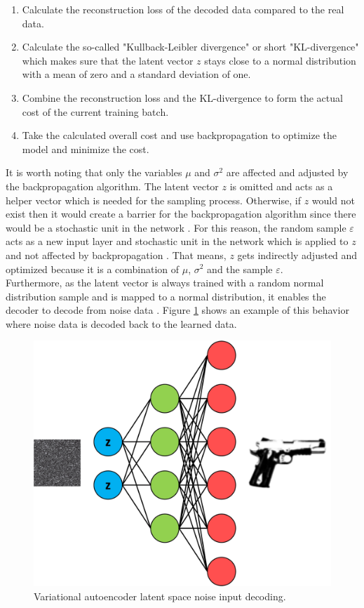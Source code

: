 \documentclass[MGS,Master,english]{twbook}%
\begin{document}
\begin{enumerate}
	\item Calculate the reconstruction loss of the decoded data compared to the real data.
	\item Calculate the so-called "Kullback-Leibler divergence" or short "KL-divergence" which makes sure that the latent vector $z$ stays close to a normal distribution with a mean of zero and a standard deviation of one.
	\item Combine the reconstruction loss and the KL-divergence to form the actual cost of the current training batch.
	\item Take the calculated overall cost and use backpropagation to optimize the model and minimize the cost.
\end{enumerate}
It is worth noting that only the variables $\mu$ and $\sigma^{2}$ are affected and adjusted by the backpropagation algorithm. The latent vector $z$ is omitted and acts as a helper vector which is needed for the sampling process. Otherwise, if $z$ would not exist then it would create a barrier for the backpropagation algorithm since there would be a stochastic unit in the network \cite{ml::vae::tutorial}. For this reason, the random sample $\varepsilon$ acts as a new input layer and stochastic unit in the network which is applied to $z$ and not affected by backpropagation \cite{ml::vae::tutorial}. That means, $z$ gets indirectly adjusted and optimized because it is a combination of $\mu$, $\sigma^{2}$ and the sample $\varepsilon$.\\
Furthermore, as the latent vector is always trained with a random normal distribution sample and is mapped to a normal distribution, it enables the decoder to decode from noise data \cite{ml::vae::tutorial}. Figure \ref{fig::vae_noise_decoding} shows an example of this behavior where noise data is decoded back to the learned data. \\
\begin{figure}[!htbp]
	\centering
	\includegraphics[width=0.7\linewidth]{PICs/NNs/variational_autoencoder_noise_decoding}
	\caption{Variational autoencoder latent space noise input decoding.} \label{fig::vae_noise_decoding}
\end{figure}\\
\end{document}
